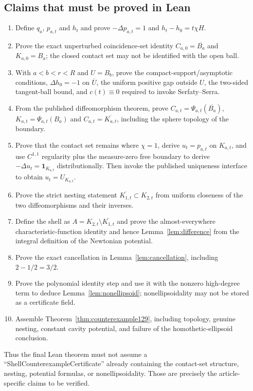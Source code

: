 \documentclass[11pt]{article}
\theoremstyle{definition}
\theoremstyle{remark}
\newcommand{\lap}{\Delta}
\newcommand{\1}{\mathbf{1}}
\begin{document}
\subsection*{Claims that must be proved in Lean}
\begin{enumerate}[label=\textbf{L129.\arabic*.}]
\item Define $q_a$, $p_{a,t}$ and $h_t$ and prove $-\lap p_{a,t}=1$ and $h_t-h_0=t\chi H$.
\item Prove the exact unperturbed coincidence-set identity $C_{a,0}=\overline{B_a}$ and $K_{a,0}=B_a$; the closed contact set may not be identified with the open ball.
\item With $a<b<r<R$ and $U=B_b$, prove the compact-support/asymptotic conditions, $\lap h_0=-1$ on $\overline U$, the uniform positive gap outside $U$, the two-sided tangent-ball bound, and $c(t)\equiv0$ required to invoke Serfaty--Serra.
\item From the published diffeomorphism theorem, prove $C_{a,t}=\Psi_{a,t}(\overline{B_a})$, $K_{a,t}=\Psi_{a,t}(B_a)$ and $C_{a,t}=\overline{K_{a,t}}$, including the sphere topology of the boundary.
\item Prove that the contact set remains where $\chi=1$, derive $u_t=p_{a,t}$ on $K_{a,t}$, and use $C^{1,1}$ regularity plus the measure-zero free boundary to derive $-\lap u_t=\1_{K_{a,t}}$ distributionally. Then invoke the published uniqueness interface to obtain $u_t=U_{K_{a,t}}$.
\item Prove the strict nesting statement $\overline{K_{1,t}}\subset K_{2,t}$ from uniform closeness of the two diffeomorphisms and their inverses.
\item Define the shell as $A=K_{2,t}\setminus\overline{K_{1,t}}$ and prove the almost-everywhere characteristic-function identity and hence Lemma~\ref{lem:difference} from the integral definition of the Newtonian potential.
\item Prove the exact cancellation in Lemma~\ref{lem:cancellation}, including $2-1/2=3/2$.
\item Prove the polynomial identity step and use it with the nonzero high-degree term to deduce Lemma~\ref{lem:nonellipsoid}; nonellipsoidality may not be stored as a certificate field.
\item Assemble Theorem~\ref{thm:counterexample129}, including topology, genuine nesting, constant cavity potential, and failure of the homothetic-ellipsoid conclusion.
\end{enumerate}

Thus the final Lean theorem must not assume a ``ShellCounterexampleCertificate'' already containing the contact-set structure, nesting, potential formulas, or nonellipsoidality. Those are precisely the article-specific claims to be verified.
\end{document}
